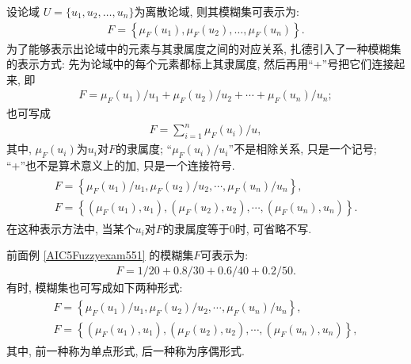 设论域 $U=\{u_1, u_2, \ldots, u_n\}$为离散论域, 则其模糊集可表示为:
\begin{align}
    F=\left\{\mu_{F}\left(u_{1}\right), \mu_{F}\left(u_{2}\right), \ldots, \mu_{F}\left(u_{n}\right)\right\}.
\end{align}
为了能够表示出论域中的元素与其隶属度之间的对应关系, 扎德引入了一种模糊集的表示方式: 先为论域中的每个元素都标上其隶属度, 然后再用“+”号把它们连接起来, 即
\begin{align}
    F=\mu_{F}\left(u_{1}\right) / u_{1}+\mu_{F}\left(u_{2}\right) / u_{2}+\cdots+\mu_{F}\left(u_{n}\right) / u_{n};
\end{align}
也可写成
\begin{align}
    F=\sum_{i=1}^{n} \mu_{F}\left(u_{i}\right) / u,
\end{align}
其中, $\mu_{F}\left(u_{i}\right)$为$u_i$对$F$的隶属度; “$\mu_{F}\left(u_{i}\right) / u_{i}$”不是相除关系, 只是一个记号; “+”也不是算术意义上的加, 只是一个连接符号.
\begin{align}
    \begin{array}{ll}
        F=\left\{\mu_{F}\left(u_{1}\right) / u_{1}, \mu_{F}\left(u_{2}\right) / u_{2}, \cdots, \mu_{F}\left(u_{n}\right) / u_{n}\right\},\\
        F=\left\{\left(\mu_{F}\left(u_{1}\right), u_{1}\right),\left(\mu_{F}\left(u_{2}\right), u_{2}\right), \cdots,\left(\mu_{F}\left(u_{n}\right), u_{n}\right)\right\}.
    \end{array}
\end{align}
在这种表示方法中, 当某个$u_i$对$F$的隶属度等于$0$时, 可省略不写.
\begin{example}
    前面例 \ref{AIC5Fuzzyexam551} 的模糊集$F$可表示为:
    \begin{align*}
        F=1 / 20+0.8 / 30+0.6 / 40+0.2 / 50.
    \end{align*}
    有时, 模糊集也可写成如下两种形式:
    \begin{align*}
        \begin{array}{l}
            F=\left\{\mu_{F}\left(u_{1}\right) / u_{1}, \mu_{F}\left(u_{2}\right) / u_{2}, \cdots, \mu_{F}\left(u_{n}\right) / u_{n}\right\},\\
            F=\left\{\left(\mu_{F}\left(u_{1}\right), u_{1}\right),\left(\mu_{F}\left(u_{2}\right), u_{2}\right), \cdots,\left(\mu_{F}\left(u_{n}\right), u_{n}\right)\right\},
        \end{array}
    \end{align*}
其中, 前一种称为单点形式, 后一种称为序偶形式. 
\end{example}


